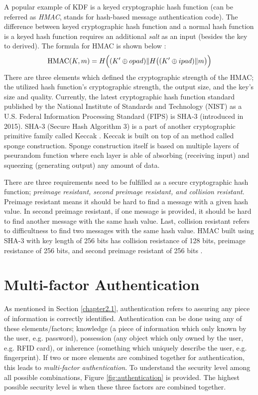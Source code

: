A popular example of KDF is a keyed cryptographic hash function (can be referred as \textit{HMAC}, stands for hash-based message authentication code). The difference between keyed cryptographic hash function and a normal hash function is a keyed hash function requires an additional \textit{salt} as an input (besides the key to derived).
The formula for HMAC is shown below \cite{rfc2104}:
\begin{equation}
  {\displaystyle \operatorname {HMAC} (K,m)=H{\Bigl (}(K'\oplus opad)\|H{\bigl (}(K'\oplus ipad)\|m{\bigr )}{\Bigr )}}
\end{equation}
There are three elements which defined the cryptographic strength of the HMAC; the utilized hash function's cryptographic strength, the output size, and the key's size and quality. Currently, the latest cryptographic hash function standard published by the National Institute of Standards and Technology (NIST) as a U.S. Federal Information Processing Standard (FIPS) is SHA-3 (introduced in 2015). SHA-3 (Secure Hash Algorithm 3) is a part of another cryptographic primitive family called Keccak \cite{10.1007/978-3-642-38348-9_19}. Keccak is built on top of an method called sponge construction. Sponge construction itself is based on multiple layers of pseurandom function where each layer is able of absorbing (receiving input) and squeezing (generating output) any amount of data.

There are three requirements need to be fulfilled as a secure cryptographic hash function; \textit{preimage resistant, second preimage resistant, and collision resistant}. Preimage resistant means it should be hard to find a message with a given hash value. In second preimage resistant, if one message is provided, it should be hard to find another message with the same hash value.
Last, collision resistant refers to difficultness to find two messages with the same hash value. HMAC built using SHA-3 with key length of 256 bits has collision resistance of 128 bits, preimage resistance of 256 bits, and second preimage resistant of	256 bits \cite{technology2015sha}.

\section{Multi-factor Authentication}
\label{chp:2.mfa}
As mentioned in Section \ref{chapter2.1}, authentication refers to assuring any piece of information is correctly identified. Authentication can be done using any of these elements/factors; knowledge (a piece of information which only known by the user, e.g. password), possession (any object which only owned by the user, e.g. RFID card), or inherence (something which uniquely describe the user, e.g. fingerprint). If two or more elements are combined together for authentication, this leads to \textit{multi-factor authentication}. To understand the security level among all possible combinations, Figure \ref{fig:authentication} is provided. The highest possible security level is when these three factors are combined together.

